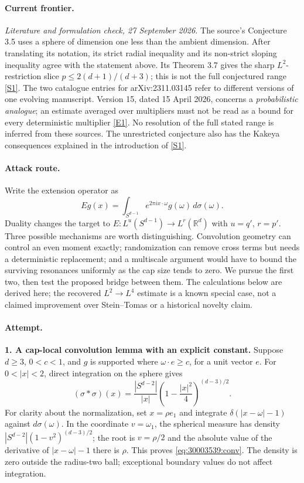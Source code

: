 \documentclass[11pt,a4paper]{article}
\newcommand{\R}{\mathbb{R}}
\newcommand{\sref}[2]{\hyperlink{source:#1:#2}{[S#2]}}
\newcommand{\eref}[2]{\hyperlink{extra:#1:#2}{[E#2]}}
\numberwithin{equation}{section}
\begin{document}
\paragraph{Current frontier.}
\textit{Literature and formulation check, 27 September 2026.}
The source's Conjecture 3.5 uses a sphere of dimension one less than the
ambient dimension. After translating its notation, its strict radial
inequality and its non-strict sloping inequality agree with the statement
above. Its Theorem 3.7 gives the sharp $L^2$-restriction slice
$p\le 2(d+1)/(d+3)$; this is not the full conjectured range
\sref{30003539}{1}. The two catalogue entries for arXiv:2311.03145 refer to different
versions of one evolving manuscript. Version 15, dated 15 April 2026, concerns
a \emph{probabilistic analogue}; an estimate averaged over multipliers must
not be read as a bound for every deterministic multiplier
\eref{30003539}{1}. No resolution of the full stated range is inferred from these
sources. The unrestricted conjecture also has the Kakeya consequences
explained in the introduction of \sref{30003539}{1}.

\paragraph{Attack route.}
Write the extension operator as
\[
 Eg(x)=\int_{S^{d-1}} e^{2\pi i x\cdot\omega}g(\omega)\,d\sigma(\omega).
\]
Duality changes the target to $E:L^u(S^{d-1})\to L^r(\R^d)$ with
$u=q'$, $r=p'$. Three possible mechanisms are worth distinguishing.
Convolution geometry can control an even moment exactly; randomization can
remove cross terms but needs a deterministic replacement; and a multiscale
argument would have to bound the surviving resonances uniformly as the cap
size tends to zero. We pursue the first two, then test the proposed bridge
between them. The calculations below are derived here; the recovered
$L^2\to L^4$ estimate is a known special case, not a claimed improvement over
Stein--Tomas or a historical novelty claim.

\paragraph{Attempt.}
\textbf{1. A cap-local convolution lemma with an explicit constant.}
Suppose $d\ge3$, $0<c<1$, and $g$ is supported where
$\omega\cdot e\ge c$, for a unit vector $e$. For $0<|x|<2$, direct
integration on the sphere gives
\begin{equation}\label{eq:30003539:conv}
 (\sigma*\sigma)(x)=\frac{|S^{d-2}|}{|x|}
       \left(1-\frac{|x|^2}{4}\right)^{(d-3)/2}.
\end{equation}
For clarity about the normalization, set $x=\rho e_1$ and integrate
$\delta(|x-\omega|-1)$ against $d\sigma(\omega)$. In the coordinate
$v=\omega_1$, the spherical measure has density
$|S^{d-2}|(1-v^2)^{(d-3)/2}$; the root is $v=\rho/2$ and the absolute
value of the derivative of $|x-\omega|-1$ there is $\rho$. This proves
\eqref{eq:30003539:conv}. The density is zero outside the radius-two ball;
exceptional boundary values do not affect integration.
\end{document}
